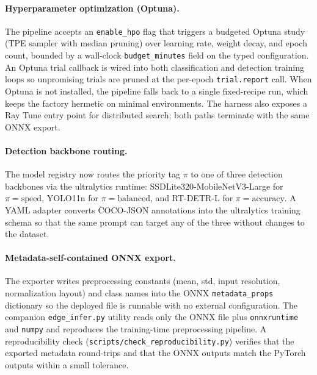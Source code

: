 \documentclass[10pt,twocolumn,letterpaper]{article}
\begin{document}
\paragraph{Hyperparameter optimization (Optuna).}
The pipeline accepts an \texttt{enable\_hpo} flag that triggers a
budgeted Optuna study (TPE sampler with median pruning) over learning
rate, weight decay, and epoch count, bounded by a wall-clock
\texttt{budget\_minutes} field on the typed configuration. An Optuna
trial callback is wired into both classification and detection
training loops so unpromising trials are pruned at the per-epoch
\texttt{trial.report} call. When Optuna is not installed, the
pipeline falls back to a single fixed-recipe run, which keeps the
factory hermetic on minimal environments. The harness also exposes a
Ray Tune entry point for distributed search; both paths terminate
with the same ONNX export.

\paragraph{Detection backbone routing.}
The model registry now routes the priority tag $\pi$ to one of three
detection backbones via the ultralytics runtime:
SSDLite320-MobileNetV3-Large for $\pi{=}\text{speed}$,
YOLO11n for $\pi{=}\text{balanced}$, and RT-DETR-L for
$\pi{=}\text{accuracy}$. A YAML adapter converts COCO-JSON
annotations into the ultralytics training schema so that the same
prompt can target any of the three without changes to the dataset.

\paragraph{Metadata-self-contained ONNX export.}
The exporter writes preprocessing constants (mean, std, input
resolution, normalization layout) and class names into the ONNX
\texttt{metadata\_props} dictionary so the deployed file is
runnable with no external configuration. The companion
\texttt{edge\_infer.py} utility reads only the ONNX file plus
\texttt{onnxruntime} and \texttt{numpy} and reproduces the training-time
preprocessing pipeline. A reproducibility check
(\texttt{scripts/check\_reproducibility.py}) verifies that the
exported metadata round-trips and that the ONNX outputs match the
PyTorch outputs within a small tolerance.
\end{document}
